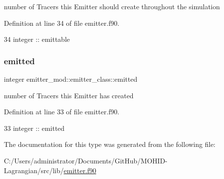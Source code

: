 number of Tracers this Emitter should create throughout the simulation 



Definition at line 34 of file emitter.\+f90.


\begin{DoxyCode}
34         \textcolor{keywordtype}{integer} :: emittable
\end{DoxyCode}
\mbox{\label{structemitter__mod_1_1emitter__class_aa8f56d34f32e452a2e78f93f44780b4b}} 
\subsubsection{\texorpdfstring{emitted}{emitted}}
{\footnotesize\ttfamily integer emitter\+\_\+mod\+::emitter\+\_\+class\+::emitted\hspace{0.3cm}{\ttfamily [private]}}



number of Tracers this Emitter has created 



Definition at line 33 of file emitter.\+f90.


\begin{DoxyCode}
33         \textcolor{keywordtype}{integer} :: emitted
\end{DoxyCode}


The documentation for this type was generated from the following file\+:\begin{DoxyCompactItemize}
\item 
C\+:/\+Users/administrator/\+Documents/\+Git\+Hub/\+M\+O\+H\+I\+D-\/\+Lagrangian/src/lib/\mbox{\hyperlink{emitter_8f90}{emitter.\+f90}}\end{DoxyCompactItemize}

